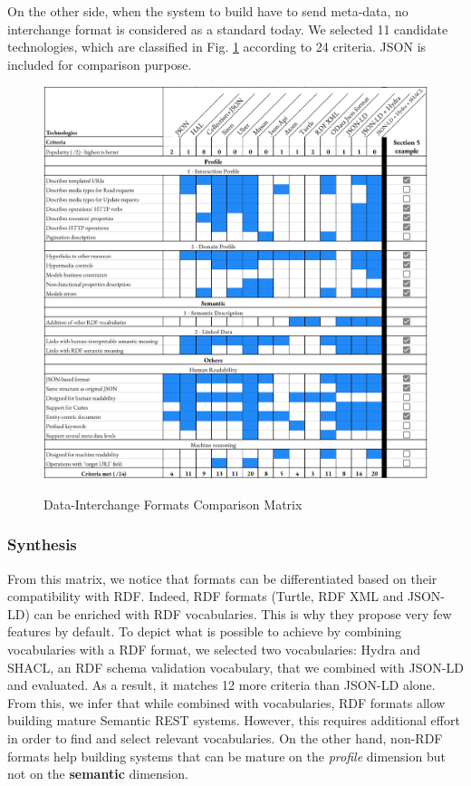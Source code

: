 On the other side, when the system to build have to send meta-data, no interchange format is considered as a standard today. We selected 11 candidate technologies, which are classified in Fig. \ref{interchange-formats-matrix} according to 24 criteria. JSON is included for comparison purpose.

\begin{figure}[ht]
\caption{Data-Interchange Formats Comparison Matrix}
\includegraphics[width=1\textwidth]{figures/DIF.png}
\label{interchange-formats-matrix}
\end{figure}

\subsubsection*{Synthesis}
From this matrix, we notice that formats can be differentiated based on their compatibility with RDF. Indeed, RDF formats (Turtle, RDF XML and JSON-LD) can be enriched with RDF vocabularies. This is why they propose very few features by default. To depict what is possible to achieve by combining vocabularies with a RDF format, we selected two vocabularies: Hydra and SHACL, an RDF schema validation vocabulary, that we combined with JSON-LD and evaluated. As a result, it matches 12 more criteria than JSON-LD alone.
From this, we infer that while combined with vocabularies, RDF formats allow building mature Semantic REST systems. However, this requires additional effort in order to find and select relevant vocabularies.
On the other hand, non-RDF formats help building systems that can be mature on the \textit{profile} dimension but not on the \textbf{semantic} dimension.

